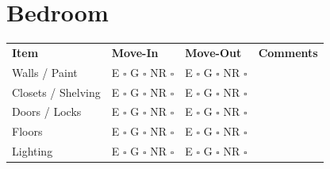 
\section*{Bedroom}
\label{sec:bedroom}

\begin{longtable}{p{6cm} p{3cm} p{3cm} p{4cm}}
\textbf{Item} & \textbf{Move-In} & \textbf{Move-Out} & \textbf{Comments} \\
Walls / Paint & E $\square$ G $\square$ NR $\square$ & E $\square$ G $\square$ NR $\square$ & \\
Closets / Shelving & E $\square$ G $\square$ NR $\square$ & E $\square$ G $\square$ NR $\square$ & \\
Doors / Locks & E $\square$ G $\square$ NR $\square$ & E $\square$ G $\square$ NR $\square$ & \\
Floors & E $\square$ G $\square$ NR $\square$ & E $\square$ G $\square$ NR $\square$ & \\
Lighting & E $\square$ G $\square$ NR $\square$ & E $\square$ G $\square$ NR $\square$ & \\
\end{longtable}

